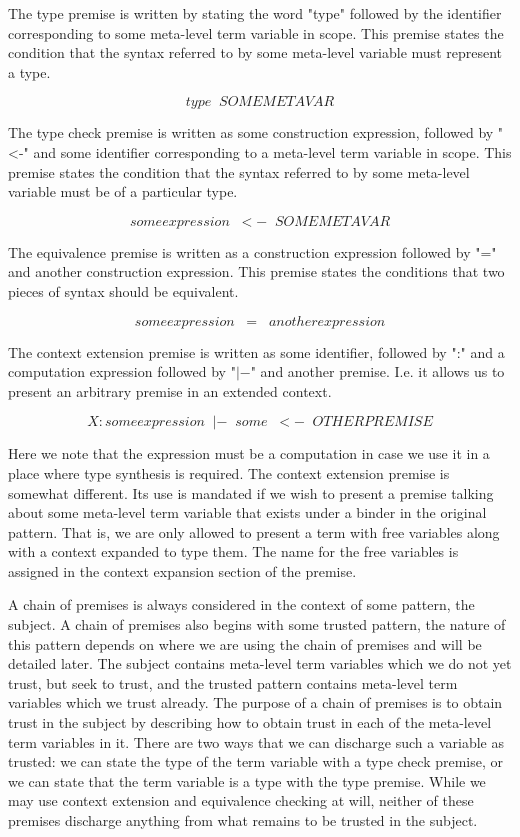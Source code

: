 The type premise is written by stating the word "type" followed by
the identifier corresponding to some meta-level term variable in
scope. This premise states the condition that the syntax referred to
by some meta-level variable must represent a type.

$$
type \;\; SOMEMETAVAR
$$

The type check premise is written as some construction expression,
followed by "\textless -" and some identifier corresponding to a
meta-level term variable in scope. This premise states the condition that
the syntax referred to by some meta-level variable must be of a
particular type.

$$
someexpression \;\;<-\;\; SOMEMETAVAR
$$

The equivalence premise is written as a construction expression
followed by "=" and another construction expression. This premise
states the conditions that two pieces of syntax should be equivalent.

$$
someexpression \;\;=\;\; anotherexpression
$$

The context extension premise is written as some identifier,
followed by ":" and a computation expression followed by "$|-$" and
another premise. I.e. it allows us to present an arbitrary premise in
an extended context.

$$
X : someexpression \;\;|-\;\; some \;\;<-\;\; OTHERPREMISE
$$

Here we note that the expression must be a computation in case we use
it in a place where type synthesis is required. The context
extension premise is somewhat different. Its use is mandated if
we wish to present a premise talking about some meta-level term
variable that exists under a binder in the original pattern. That is,
we are only allowed to present a term with free variables along with a
context expanded to type them. The name for the free variables is
assigned in the context expansion section of the premise.

A chain of premises is always considered in the context of some
pattern, the subject. A chain of premises also begins with some
trusted pattern, the nature of this pattern depends on where we are
using the chain of premises and will be detailed later. The subject
contains meta-level term variables which we do not yet trust, but seek
to trust, and the trusted pattern contains meta-level term variables
which we trust already. The purpose of a chain of premises is to obtain
trust in the subject by describing how to obtain trust in each of the
meta-level term variables in it. There are two ways that we can
discharge such a variable as trusted: we can state the type of the
term variable with a type check premise, or we can state that the term
variable is a type with the type premise. While we may use context
extension and equivalence checking at will, neither of these premises
discharge anything from what remains to be trusted in the subject.

